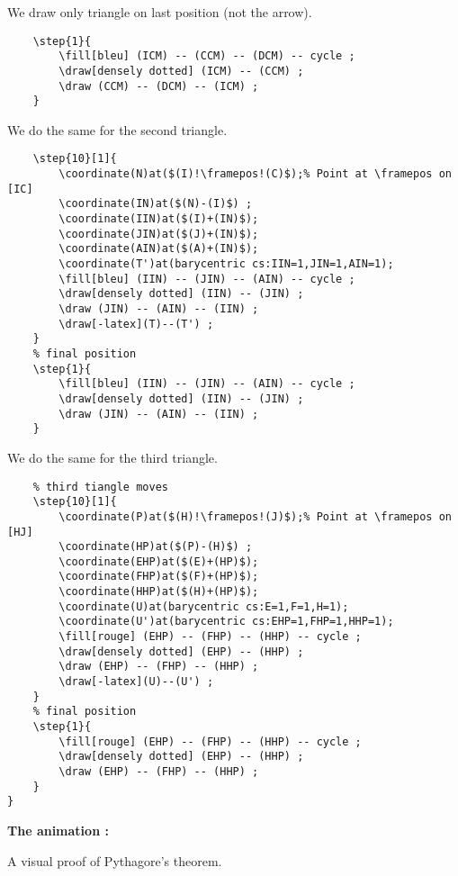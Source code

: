 \documentclass[a4paper,12pt]{article}
\begin{document}
We draw only triangle on last position (not the arrow).

\begin{lstlisting}[name=exemplecomplet]
	% final postion
	\step{1}{
		\fill[bleu] (ICM) -- (CCM) -- (DCM) -- cycle ;
		\draw[densely dotted] (ICM) -- (CCM) ;
		\draw (CCM) -- (DCM) -- (ICM) ;
	}
\end{lstlisting}

We do the same for the second triangle.

\begin{lstlisting}[name=exemplecomplet]
	% second triangle moves
	\step{10}[1]{
		\coordinate(N)at($(I)!\framepos!(C)$);% Point at \framepos on [IC]
		\coordinate(IN)at($(N)-(I)$) ;
		\coordinate(IIN)at($(I)+(IN)$);
		\coordinate(JIN)at($(J)+(IN)$);
		\coordinate(AIN)at($(A)+(IN)$);
		\coordinate(T')at(barycentric cs:IIN=1,JIN=1,AIN=1);
		\fill[bleu] (IIN) -- (JIN) -- (AIN) -- cycle ;
		\draw[densely dotted] (IIN) -- (JIN) ;
		\draw (JIN) -- (AIN) -- (IIN) ;
		\draw[-latex](T)--(T') ;
	}
	% final position 
	\step{1}{
		\fill[bleu] (IIN) -- (JIN) -- (AIN) -- cycle ;
		\draw[densely dotted] (IIN) -- (JIN) ;
		\draw (JIN) -- (AIN) -- (IIN) ;
	}
 \end{lstlisting}
 
 We do the same for the third triangle.

 \begin{lstlisting}
	% third tiangle moves
	\step{10}[1]{
		\coordinate(P)at($(H)!\framepos!(J)$);% Point at \framepos on [HJ]
		\coordinate(HP)at($(P)-(H)$) ;
		\coordinate(EHP)at($(E)+(HP)$);
		\coordinate(FHP)at($(F)+(HP)$);
		\coordinate(HHP)at($(H)+(HP)$);
		\coordinate(U)at(barycentric cs:E=1,F=1,H=1);
		\coordinate(U')at(barycentric cs:EHP=1,FHP=1,HHP=1);
		\fill[rouge] (EHP) -- (FHP) -- (HHP) -- cycle ;
		\draw[densely dotted] (EHP) -- (HHP) ;
		\draw (EHP) -- (FHP) -- (HHP) ;
		\draw[-latex](U)--(U') ;
	}
	% final position
	\step{1}{
		\fill[rouge] (EHP) -- (FHP) -- (HHP) -- cycle ;
		\draw[densely dotted] (EHP) -- (HHP) ;
		\draw (EHP) -- (FHP) -- (HHP) ;
	}
}
\end{lstlisting}

\textbf{The animation :}

A visual proof of Pythagore's theorem.
\end{document}
